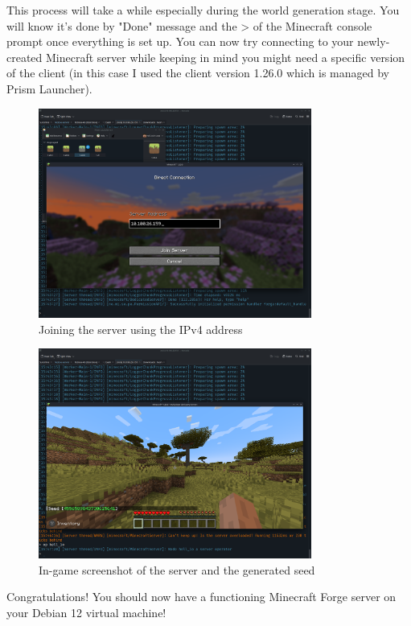 \documentclass[]{article}
\begin{document}
This process will take a while especially during the world generation stage. You will know it's done by "Done" message and the > of the Minecraft console prompt once everything is set up. You can now try connecting to your newly-created Minecraft server while keeping in mind you might need a specific version of the client (in this case I used the client version 1.26.0 which is managed by Prism Launcher).

\begin{figure}[h!]
	\caption{Joining the server using the IPv4 address}
	\centering
	\includegraphics[width=0.8\textwidth]{mc-connect}
\end{figure}
\FloatBarrier

\begin{figure}[h!]
	\caption{In-game screenshot of the server and the generated seed}
	\centering
	\includegraphics[width=0.8\textwidth]{mc-server}
\end{figure}
\FloatBarrier

Congratulations! You should now have a functioning Minecraft Forge server on your Debian 12 virtual machine!
\end{document}
